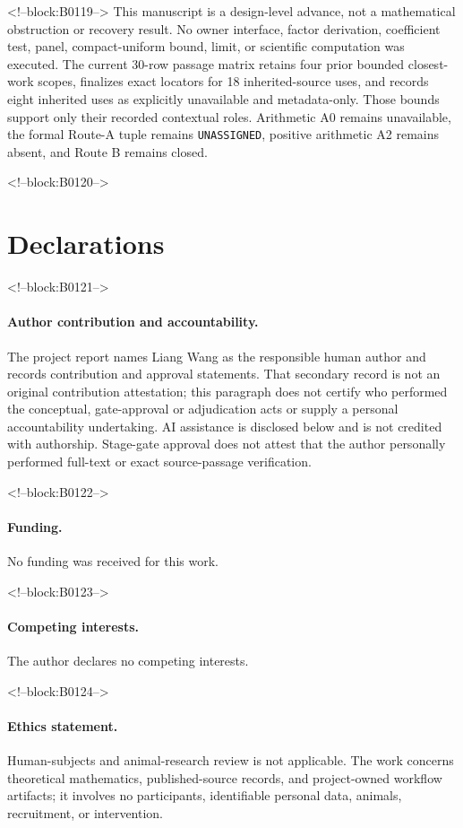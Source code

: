 \documentclass[11pt]{article}
\begin{document}
<!--block:B0119-->
This manuscript is a design-level advance, not a mathematical
obstruction or recovery result. No owner interface, factor derivation, coefficient
test, panel, compact-uniform bound, limit, or scientific computation was executed.
The current 30-row passage matrix retains four prior bounded closest-work scopes,
finalizes exact locators for 18 inherited-source uses, and records eight inherited
uses as explicitly unavailable and metadata-only. Those bounds support only their
recorded contextual roles. Arithmetic A0 remains unavailable, the formal Route-A
tuple remains \texttt{UNASSIGNED}, positive arithmetic A2 remains absent, and Route B
remains closed.

<!--block:B0120-->
\section*{Declarations}

<!--block:B0121-->
\paragraph{Author contribution and accountability.}
The project report names Liang Wang as the responsible human author and records
contribution and approval statements. That secondary record is not an original
contribution attestation; this paragraph does not certify who performed the
conceptual, gate-approval or adjudication acts or supply a personal accountability
undertaking. AI assistance is disclosed below and is not credited with authorship.
Stage-gate approval does not attest that the author personally performed full-text
or exact source-passage verification.

<!--block:B0122-->
\paragraph{Funding.} No funding was received for this work.

<!--block:B0123-->
\paragraph{Competing interests.} The author declares no competing
interests.

<!--block:B0124-->
\paragraph{Ethics statement.} Human-subjects and animal-research review
is not applicable. The work concerns theoretical mathematics,
published-source records, and project-owned workflow artifacts; it
involves no participants, identifiable personal data, animals,
recruitment, or intervention.
\end{document}
